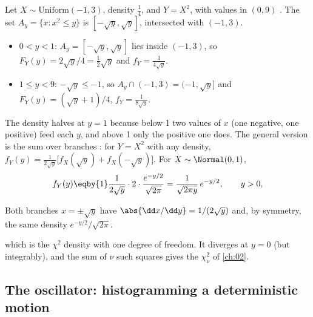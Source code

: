 \label{1b:ex:square}
Let $X\sim\text{Uniform}(-1,3)$, density $\tfrac14$, and $Y=X^2$, with values
in $(0,9)$ . The set $A_y=\{x:x^2\le y\}$ is
$[-\sqrt y,\sqrt y]$, intersected with $(-1,3)$.
\begin{itemize}[leftmargin=1.2em,itemsep=1pt]
  \item $0<y<1$: $A_y=[-\sqrt y,\sqrt y]$ lies inside $(-1,3)$, so
        $F_Y(y)=2\sqrt y/4=\tfrac12\sqrt y$ and $f_Y=\frac{1}{4\sqrt y}$.
  \item $1\le y<9$: $-\sqrt y\le-1$, so $A_y\cap(-1,3)=(-1,\sqrt y]$ and
        $F_Y(y)=(\sqrt y+1)/4$, $f_Y=\frac{1}{8\sqrt y}$.
\end{itemize}
The density halves at $y=1$ because below 1 two values of $x$ (one negative,
one positive) feed each $y$, and above 1 only the positive one does. The
general version is the sum over branches :
for $Y=X^2$ with any density,
$f_Y(y)=\frac{1}{2\sqrt y}\bigl[f_X(\sqrt y)+f_X(-\sqrt y)\bigr]$. For
$X\sim\Normal(0,1)$,
\begin{align*}
  f_Y(y)
  \eqby{1} \frac{1}{2\sqrt y}\cdot2\cdot\frac{e^{-y/2}}{\sqrt{2\pi}}
  = \frac{1}{\sqrt{2\pi y}}\,e^{-y/2},\qquad y>0,
\end{align*}
\begin{explain}
  \item Both branches $x=\pm\sqrt y$ have $\abs{\dd x/\dd y}=1/(2\sqrt y)$
        and, by symmetry, the same density $e^{-y/2}/\sqrt{2\pi}$.
\end{explain}
which is the $\chi^2$ density with one degree of freedom. It diverges at
$y=0$ (but integrably), and the sum of $\nu$ such squares gives the
$\chi^2_\nu$ of \cref{ch:02}.

\subsection{The oscillator: histogramming a deterministic motion}
\label{1b:ex:arcsine}

